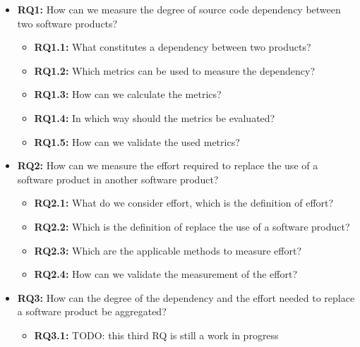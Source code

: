 \begin{itemize}
    \item \textbf{RQ1:} How can we measure the degree of source code dependency between two software products?

    \begin{itemize}
      \item \textbf{RQ1.1:} What constitutes a dependency between two products?
      \item \textbf{RQ1.2:} Which metrics can be used to measure the dependency?
      \item \textbf{RQ1.3:} How can we calculate the metrics?
      \item \textbf{RQ1.4:} In which way should the metrics be evaluated?
      \item \textbf{RQ1.5:} How can we validate the used metrics?
    \end{itemize}

    \item \textbf{RQ2:} How can we measure the effort required to replace the use of a software product in another software product?

    \begin{itemize}
      \item \textbf{RQ2.1:} What do we consider effort, which is the definition of effort?
      \item \textbf{RQ2.2:} Which is the definition of replace the use of a software product?
      \item \textbf{RQ2.3:} Which are the applicable methods to measure effort?
      \item \textbf{RQ2.4:} How can we validate the measurement of the effort?
    \end{itemize}

    \item \textbf{RQ3:} How can the degree of the dependency and the effort needed to replace a software product be aggregated?
    \begin{itemize}
      \item \textbf{RQ3.1:} TODO: this third RQ is still a work in progress
    \end{itemize}
\end{itemize}
